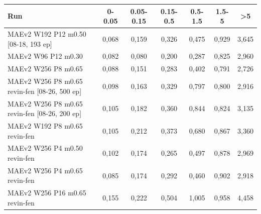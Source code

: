 \begin{tabular}{lcccccc}
\toprule
Run & 0-0.05 & 0.05-0.15 & 0.15-0.5 & 0.5-1.5 & 1.5-5 & >5 \\
\midrule
MAEv2 W192 P12 m0.50 [08-18, 193 ep] & 0,068 & 0,159 & 0,326 & 0,475 & 0,929 & 3,645 \\
MAEv2 W96 P12 m0.30 & 0,082 & 0,080 & 0,200 & 0,287 & 0,825 & 2,960 \\
MAEv2 W256 P8 m0.65 & 0,088 & 0,151 & 0,283 & 0,402 & 0,791 & 2,726 \\
MAEv2 W256 P8 m0.65 revin-fen [08-26, 500 ep] & 0,098 & 0,163 & 0,329 & 0,797 & 0,800 & 2,916 \\
MAEv2 W256 P8 m0.65 revin-fen [08-26, 200 ep] & 0,105 & 0,182 & 0,360 & 0,844 & 0,824 & 3,135 \\
MAEv2 W192 P8 m0.65 revin-fen & 0,105 & 0,212 & 0,373 & 0,680 & 0,867 & 3,360 \\
MAEv2 W256 P4 m0.50 revin-fen & 0,102 & 0,174 & 0,265 & 0,497 & 0,878 & 2,969 \\
MAEv2 W256 P4 m0.65 revin-fen & 0,085 & 0,174 & 0,292 & 0,460 & 0,902 & 2,918 \\
MAEv2 W256 P16 m0.65 revin-fen & 0,155 & 0,222 & 0,504 & 1,005 & 0,958 & 4,458 \\
\bottomrule
\end{tabular}
